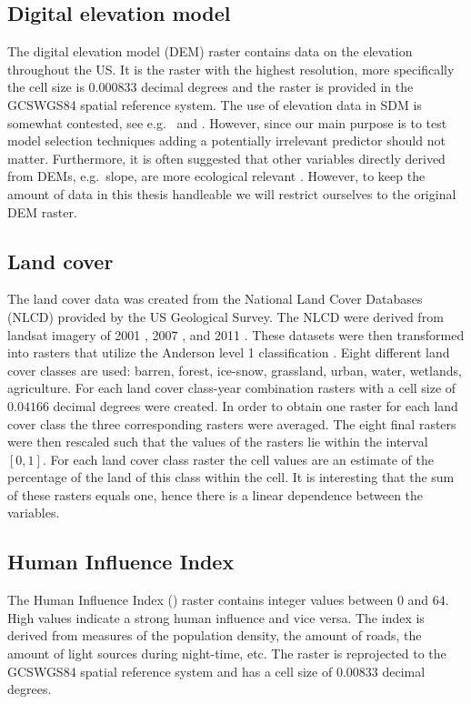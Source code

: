 \subsection{Digital elevation model}
The digital elevation model (DEM) raster \parencite{DEM} contains data on the elevation throughout the US. It is the raster with the highest resolution, more specifically the cell size is $0.000833$ decimal degrees and the raster is provided in the GCS\textunderscore WGS84 spatial reference system. The use of elevation data in SDM is somewhat contested, see e.g.\ \cite{hof_usefulness_2012} and \cite{oke_distribution_2015}. However, since our main purpose is to test model selection techniques adding a potentially irrelevant predictor should not matter. Furthermore, it is often suggested that other variables directly derived from DEMs, e.g.\ slope, are more ecological relevant \parencite{franklin_mapping_2009}. However, to keep the amount of data in this thesis handleable we will restrict ourselves to the original DEM raster.


\subsection{Land cover}
The land cover data was created from the National Land Cover Databases (NLCD) provided by the US Geological Survey. The NLCD were derived from landsat imagery of 2001 \parencite{vogelmann2001completion}, 2007 \parencite{homer2007completion}, and 2011 \parencite{fry2011completion}. These datasets were then transformed into rasters that utilize the Anderson level 1 classification \parencite{anderson_land_1976}. Eight different land cover classes are used: barren, forest, ice-snow, grassland, urban, water, wetlands, agriculture. For each land cover class-year combination rasters with a cell size of $0.04166$ decimal degrees were created. In order to obtain one raster for each land cover class the three corresponding rasters were averaged. The eight final rasters were then rescaled such that the values of the rasters lie within the interval $[0,1]$. For each land cover class raster the cell values are an estimate of the percentage of the land of this class within the cell. It is interesting that the sum of these rasters equals one, hence there is a linear dependence between the variables.

\subsection{Human Influence Index}
The Human Influence Index (\citeauthor{hii}) raster contains integer values between $0$ and $64$. High values indicate a strong human influence and vice versa. The index is derived from measures of the population density, the amount of roads, the amount of light sources during night-time, etc. The raster is reprojected to the GCS\textunderscore WGS84 spatial reference system and has a cell size of $0.00833$ decimal degrees.

